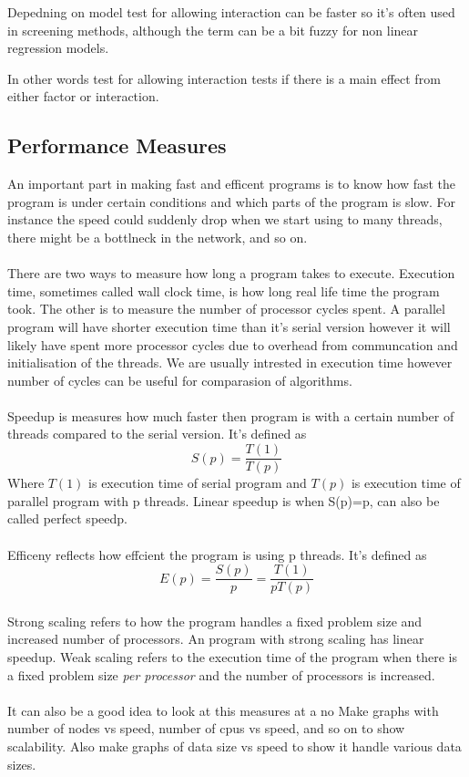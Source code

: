 \documentclass[10pt,a4paper]{article}
\begin{document}
Depedning on model test for allowing interaction can be faster so it's often used in screening methods, although the term can be a bit fuzzy for non linear regression models. \cite{cordell_detect_review}

In other words test for allowing interaction tests if there is a main effect from either factor or interaction.



\clearpage
\subsection{Performance Measures}
An important part in making fast and efficent programs is to know how fast the program is under certain conditions and which parts of the program is slow. For instance the speed could suddenly drop when we start using to many threads, there might be a bottlneck in the network, and so on.\\
\\
There are two ways to measure how long a program takes to execute. Execution time, sometimes called wall clock time, is how long real life time the program took. The other is to measure the number of processor cycles spent. A parallel program will have shorter execution time than it's serial version however it will likely have spent more processor cycles due to overhead from communcation and initialisation of the threads. We are usually intrested in execution time however number of cycles can be useful for comparasion of algorithms.\\
\\
Speedup is measures how much faster then program is with a certain number of threads compared to the serial version. It's defined as
$$S(p)=\frac{T(1)}{T(p)}$$
Where $T(1)$ is execution time of serial program and $T(p)$ is execution time of parallel program with p threads. Linear speedup is when S(p)=p, can also be called perfect speedp.\\
\\
Efficeny reflects how effcient the program is using p threads. It's defined as
$$E(p)=\frac{S(p)}{p}=\frac{T(1)}{pT(p)}$$
\\
Strong scaling refers to how the program handles a fixed problem size and increased number of processors. An program with strong scaling has linear speedup. Weak scaling refers to the execution time of the program when there is a fixed problem size \emph{per processor} and the number of processors is increased.\cite{cuda_best_practice}\\
\\
It can also be a good idea to look at this measures at a no
Make graphs with number of nodes vs speed, number of cpus vs speed, and so on to show scalability. Also make graphs of data size vs speed to show it handle various data sizes.
\end{document}
